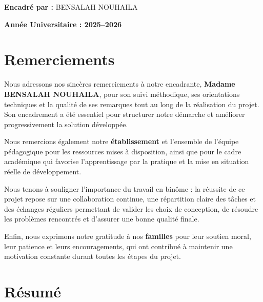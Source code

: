 \documentclass[12pt,a4paper]{report}
\begin{document}
\begin{titlepage}
\begin{minipage}{\dimexpr\textwidth-1.2cm\relax}
\vspace{0.6cm}

{\large\textbf{Encadré par :} BENSALAH NOUHAILA\par}

\vspace{1.8cm}

{\large\textbf{Année Universitaire : 2025--2026}\par}

\end{minipage}

\vfill
\null

\end{titlepage}


\chapter*{Remerciements}

Nous adressons nos sincères remerciements à notre encadrante, \textbf{Madame BENSALAH NOUHAILA}, pour son suivi méthodique, ses orientations techniques et la qualité de ses remarques tout au long de la réalisation du projet. Son encadrement a été essentiel pour structurer notre démarche et améliorer progressivement la solution développée.

Nous remercions également notre \textbf{établissement} et l’ensemble de l’équipe pédagogique pour les ressources mises à disposition, ainsi que pour le cadre académique qui favorise l’apprentissage par la pratique et la mise en situation réelle de développement.

Nous tenons à souligner l’importance du travail en binôme : la réussite de ce projet repose sur une collaboration continue, une répartition claire des tâches et des échanges réguliers permettant de valider les choix de conception, de résoudre les problèmes rencontrés et d’assurer une bonne qualité finale.

Enfin, nous exprimons notre gratitude à nos \textbf{familles} pour leur soutien moral, leur patience et leurs encouragements, qui ont contribué à maintenir une motivation constante durant toutes les étapes du projet.

\chapter*{Résumé}
\end{document}
